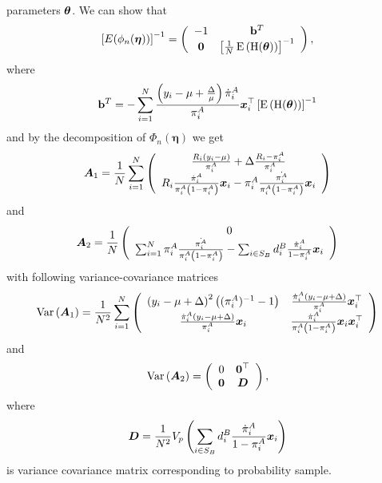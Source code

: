 \documentclass[
  letterpaper,
  DIV=11,
  numbers=noendperiod]{scrreprt}
\begin{document}
parameters \(\boldsymbol{\theta}\). We can show that \[
\begin{equation*}
\left[E(\phi_n(\boldsymbol{\eta}))\right]^{-1}=\left(\begin{array}{cc}
-1 & \mathbf{b}^T\\
\mathbf{0} & \left[\frac{1}{N}\operatorname{E}\left(\operatorname{H}(\btheta)\right)\right]^{-1}
\end{array}\right),
\end{equation*}
\] where \[
\mathbf{b}^T = - \sum_{i=1}^N \frac{\left(y_i-\mu + \frac{\Delta}{\mu}\right)\dot{\pi}_i^A}{\pi_i^A}\boldsymbol{x}_i^{\top}\left[\operatorname{E}\left(\operatorname{H}(\boldsymbol{\theta})\right)\right]^{-1}
\] and by the decomposition of \(\Phi_n(\boldsymbol{\eta})\) we get \[
\begin{equation*}
    \operatorname{\bA_1} = \frac{1}{N} \sum_{i=1}^N
    \left(\begin{array}{c}
        \frac{R_i\left(y_i - \mu\right)}{\pi_i^A} + \Delta\frac{R_i - \pi_i^A}{\pi_i^A}  \\
         R_i\frac{\dot{\pi}_i^A}{\pi_i^A\left(1 - \pi_i^A\right)} \bx_i - \pi_i^A \frac{\dot{\pi_i^A}}{\pi_i^A \left(1 - \pi_i^A\right)} \bx_i
    \end{array}\right)
\end{equation*}
\] and \[
\begin{equation*}
    \operatorname{\bA_2} = \frac{1}{N} 
    \left(\begin{array}{c}
        0  \\
        \sum_{i=1}^N \pi_i^A \frac{\dot{\pi_i^A}}{\pi_i^A\left(1 - \pi_i^A\right)} - \sum_{i \in S_B} d_i^B\frac{\dot{\pi}_i^A}{1 - \pi_i^A} \bx_i
    \end{array}\right)
\end{equation*}
\] with following variance-covariance matrices \[
\begin{equation*}
\operatorname{Var}\left(\bA_1\right) = \frac{1}{N^2} \sum_{i=1}^N
\left(\begin{array}{cc}
     \left(y_i - \mu + \Delta\right)^2 \left((\pi_i^A)^{-1} - 1\right) &     \frac{\dot{\pi}_i^A\left(y_i - \mu + \Delta\right)}{\pi_i^A}\bx_{i}^{\top}  \\
    \frac{\dot{\pi}_i^A\left(y_i - \mu + \Delta\right)}{\pi_i^A}\bx_{i} & \frac{\dot{\pi}_i^A}{\pi_i^A\left(1 - \pi_i^A\right)}\bx_i\bx_i^{\top} 
\end{array}\right)
\end{equation*}
\] and \[
\begin{equation*}
\operatorname{Var}\left(\bA_2\right) = 
\left(\begin{array}{cc}
     0 & \boldsymbol{0}^{\top} \\
     \boldsymbol{0} & \bD 
\end{array}\right),
\end{equation*}
\] where \[
\begin{align} 
    \boldsymbol{D} = \frac{1}{N^2}V_p\left(\sum_{i \in S_B} d_i^B \frac{\dot{\pi}_i^A}{1 - \pi_i^A}\boldsymbol{x}_i\right)
\end{align}
\] is variance covariance matrix corresponding to probability sample.
\end{document}
